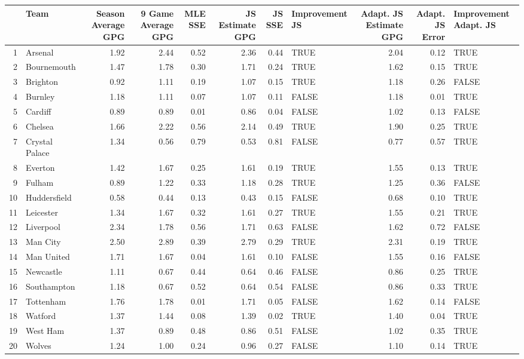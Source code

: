 \begin{table}[ht]
\centering
\begin{tabular}{rlrrrrrlrrl}
  \hline
 & Team & Season Average GPG & 9 Game Average GPG & MLE SSE & JS Estimate GPG & JS SSE & Improvement JS & Adapt. JS Estimate GPG & Adapt. JS Error & Improvement Adapt. JS \\ 
  \hline
1 & Arsenal & 1.92 & 2.44 & 0.52 & 2.36 & 0.44 & TRUE & 2.04 & 0.12 & TRUE \\ 
  2 & Bournemouth & 1.47 & 1.78 & 0.30 & 1.71 & 0.24 & TRUE & 1.62 & 0.15 & TRUE \\ 
  3 & Brighton & 0.92 & 1.11 & 0.19 & 1.07 & 0.15 & TRUE & 1.18 & 0.26 & FALSE \\ 
  4 & Burnley & 1.18 & 1.11 & 0.07 & 1.07 & 0.11 & FALSE & 1.18 & 0.01 & TRUE \\ 
  5 & Cardiff & 0.89 & 0.89 & 0.01 & 0.86 & 0.04 & FALSE & 1.02 & 0.13 & FALSE \\ 
  6 & Chelsea & 1.66 & 2.22 & 0.56 & 2.14 & 0.49 & TRUE & 1.90 & 0.25 & TRUE \\ 
  7 & Crystal Palace & 1.34 & 0.56 & 0.79 & 0.53 & 0.81 & FALSE & 0.77 & 0.57 & TRUE \\ 
  8 & Everton & 1.42 & 1.67 & 0.25 & 1.61 & 0.19 & TRUE & 1.55 & 0.13 & TRUE \\ 
  9 & Fulham & 0.89 & 1.22 & 0.33 & 1.18 & 0.28 & TRUE & 1.25 & 0.36 & FALSE \\ 
  10 & Huddersfield & 0.58 & 0.44 & 0.13 & 0.43 & 0.15 & FALSE & 0.68 & 0.10 & TRUE \\ 
  11 & Leicester & 1.34 & 1.67 & 0.32 & 1.61 & 0.27 & TRUE & 1.55 & 0.21 & TRUE \\ 
  12 & Liverpool & 2.34 & 1.78 & 0.56 & 1.71 & 0.63 & FALSE & 1.62 & 0.72 & FALSE \\ 
  13 & Man City & 2.50 & 2.89 & 0.39 & 2.79 & 0.29 & TRUE & 2.31 & 0.19 & TRUE \\ 
  14 & Man United & 1.71 & 1.67 & 0.04 & 1.61 & 0.10 & FALSE & 1.55 & 0.16 & FALSE \\ 
  15 & Newcastle & 1.11 & 0.67 & 0.44 & 0.64 & 0.46 & FALSE & 0.86 & 0.25 & TRUE \\ 
  16 & Southampton & 1.18 & 0.67 & 0.52 & 0.64 & 0.54 & FALSE & 0.86 & 0.33 & TRUE \\ 
  17 & Tottenham & 1.76 & 1.78 & 0.01 & 1.71 & 0.05 & FALSE & 1.62 & 0.14 & FALSE \\ 
  18 & Watford & 1.37 & 1.44 & 0.08 & 1.39 & 0.02 & TRUE & 1.40 & 0.04 & TRUE \\ 
  19 & West Ham & 1.37 & 0.89 & 0.48 & 0.86 & 0.51 & FALSE & 1.02 & 0.35 & TRUE \\ 
  20 & Wolves & 1.24 & 1.00 & 0.24 & 0.96 & 0.27 & FALSE & 1.10 & 0.14 & TRUE \\ 
   \hline
\end{tabular}
\end{table}
